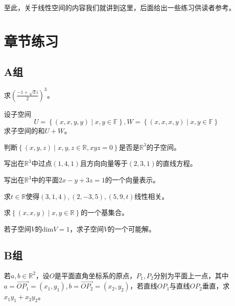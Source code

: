至此，关于线性空间的内容我们就讲到这里，后面给出一些练习供读者参考。

\section{章节练习}

\subsection{A组}

\begin{reidai}
	求$\displaystyle \left( \frac{-1+\sqrt{3}\mathrm{i}}{2} \right)^3$。
\end{reidai}

\begin{reidai}
	设子空间$$U=\left\{ (x,x,y,y)\mid x,y\in \mathbb{F} \right\},W=\left\{ (x,x,x,y)\mid x,y\in \mathbb{F} \right\}$$求子空间的和$U+W$。
\end{reidai}

\begin{reidai}
	判断$\left\{ (x,y,z) \mid x,y,z\in \mathbb{R},xyz=0 \right\}$是否是$\mathbb{R}^3$的子空间。
\end{reidai}

\begin{reidai}
	写出在$\mathbb{R}^3$中过点$(1,4,1)$且方向向量等于$(2,3,1)$的直线方程。
\end{reidai}

\begin{reidai}
	写出在$\mathbb{R}^3$中的平面$2x-y+3z=1$的一个向量表示。
\end{reidai}

\begin{reidai}
	求$t\in \mathbb{R}$使得${(3,1,4),(2,-3,5),(5,9,t)}$线性相关。
\end{reidai}

\begin{reidai}
	求$\left\{ (x,x,y)\mid x,y \in \mathbb{R} \right\}$的一个基集合。
\end{reidai}

\begin{reidai}
	若子空间$V$的$\text{dim} V=1$，求子空间$V$的一个可能解。
\end{reidai}

\subsection{B组}

\begin{reidai}
	若$a,b\in \mathbb{R}^2$，设$O$是平面直角坐标系的原点，$P_1,P_2$分别为平面上一点，其中$a=\overrightarrow{OP_1}=(x_1,y_1),b=\overrightarrow{OP_2}=(x_2,y_2)$，若直线$OP_1$与直线$OP_2$垂直，求$x_1y_1+x_2y_2$。
\end{reidai}

